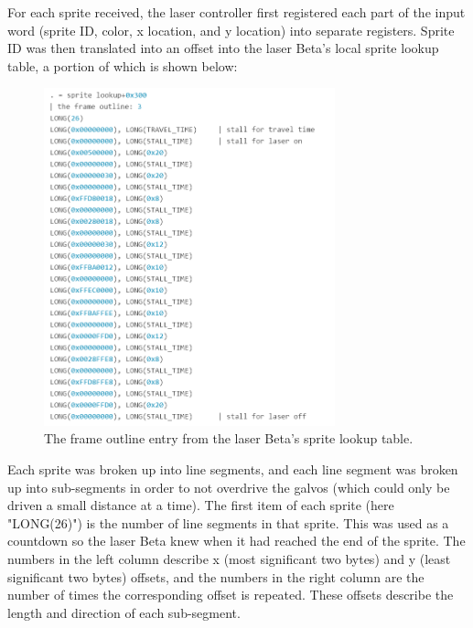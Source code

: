 \documentclass{article}
\begin{document}
	For each sprite received, the laser controller first registered each part of the input word (sprite ID, color, x location, and y location) into separate registers. Sprite ID was then translated into an offset into the laser Beta's local sprite lookup table, a portion of which is shown below:

\begin{figure}[H]
\begin{center}
\includegraphics[width=0.75\textwidth]{sprite_lookup_laser}
\caption{The frame outline entry from the laser Beta's sprite lookup table.}
\end{center}
\end{figure}

Each sprite was broken up into line segments, and each line segment was broken up into sub-segments in order to not overdrive the galvos (which could only be driven a small distance at a time). The first item of each sprite (here "LONG(26)") is the number of line segments in that sprite. This was used as a countdown so the laser Beta knew when it had reached the end of the sprite. The numbers in the left column describe x (most significant two bytes) and y (least significant two bytes) offsets, and the numbers in the right column are the number of times the corresponding offset is repeated. These offsets describe the length and direction of each sub-segment.
\end{document}
